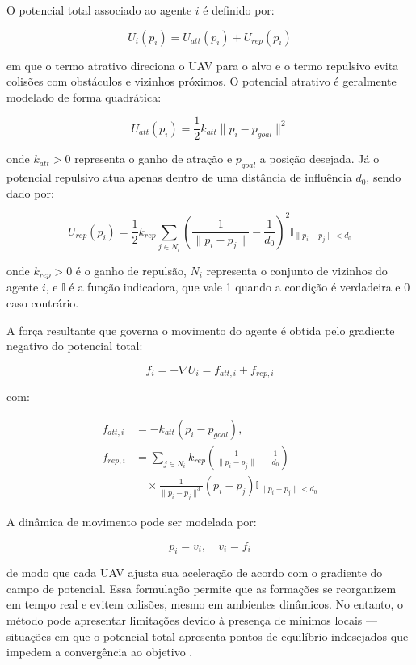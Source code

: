 \documentclass[portuguese]{sbcreviews-2025}%
\begin{document}
O potencial total associado ao agente $i$ é definido por:

\[
U_i(p_i) = U_{att}(p_i) + U_{rep}(p_i)
\]

em que o termo atrativo direciona o UAV para o alvo e o termo repulsivo evita colisões com obstáculos e vizinhos próximos. O potencial atrativo é geralmente modelado de forma quadrática:

\[
U_{att}(p_i) = \frac{1}{2} k_{att} \|p_i - p_{goal}\|^2
\]

onde $k_{att} > 0$ representa o ganho de atração e $p_{goal}$ a posição desejada. Já o potencial repulsivo atua apenas dentro de uma distância de influência $d_0$, sendo dado por:

\[
U_{rep}(p_i) =
\frac{1}{2} k_{rep} 
\sum_{j \in N_i}
\left(
\frac{1}{\|p_i - p_j\|} - \frac{1}{d_0}
\right)^2
\mathbb{I}_{\|p_i - p_j\| < d_0}
\]

onde $k_{rep} > 0$ é o ganho de repulsão, $N_i$ representa o conjunto de vizinhos do agente $i$, e $\mathbb{I}$ é a função indicadora, que vale 1 quando a condição é verdadeira e 0 caso contrário.

A força resultante que governa o movimento do agente é obtida pelo gradiente negativo do potencial total:

\[
f_i = -\nabla U_i = f_{att,i} + f_{rep,i}
\]

com:

\begin{equation}
\begin{split}
f_{att,i} &= -k_{att}(p_i - p_{goal}), \\
f_{rep,i} &= 
\sum_{j \in N_i} k_{rep}
\left(\frac{1}{\|p_i - p_j\|} - \frac{1}{d_0}\right)
\\
&\quad\times
\frac{1}{\|p_i - p_j\|^3}(p_i - p_j)
\mathbb{I}_{\|p_i - p_j\| < d_0}
\end{split}
\end{equation}

A dinâmica de movimento pode ser modelada por:

\[
\dot{p}_i = v_i, \quad
\dot{v}_i = f_i
\]

de modo que cada UAV ajusta sua aceleração de acordo com o gradiente do campo de potencial. Essa formulação permite que as formações se reorganizem em tempo real e evitem colisões, mesmo em ambientes dinâmicos. No entanto, o método pode apresentar limitações devido à presença de mínimos locais — situações em que o potencial total apresenta pontos de equilíbrio indesejados que impedem a convergência ao objetivo \cite{khatib1986real, bu2024advancement, ouyang2023formation}.
\end{document}
